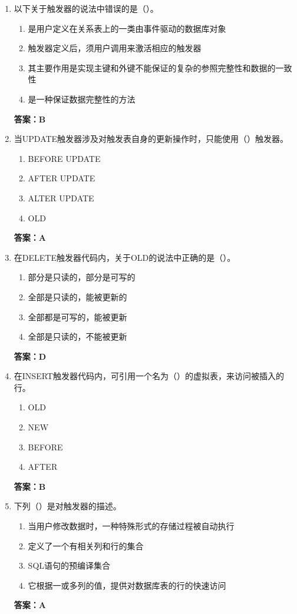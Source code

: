 \documentclass[12pt, a4paper]{article}
\begin{document}
\begin{enumerate}[label=\arabic*.]
	\item 以下关于触发器的说法中错误的是（\quad）。
	      \begin{enumerate}
		      \item 是用户定义在关系表上的一类由事件驱动的数据库对象
		      \item 触发器定义后，须用户调用来激活相应的触发器
		      \item 其主要作用是实现主键和外键不能保证的复杂的参照完整性和数据的一致性
		      \item 是一种保证数据完整性的方法
	      \end{enumerate}
	      \textbf{答案：B}

	\item 当UPDATE触发器涉及对触发表自身的更新操作时，只能使用（\quad）触发器。
	      \begin{enumerate}
		      \item BEFORE UPDATE
		      \item AFTER UPDATE
		      \item ALTER UPDATE
		      \item OLD
	      \end{enumerate}
	      \textbf{答案：A}

	\item 在DELETE触发器代码内，关于OLD的说法中正确的是（\quad）。
	      \begin{enumerate}
		      \item 部分是只读的，部分是可写的
		      \item 全部是只读的，能被更新的
		      \item 全部都是可写的，能被更新
		      \item 全部是只读的，不能被更新
	      \end{enumerate}
	      \textbf{答案：D}

	\item 在INSERT触发器代码内，可引用一个名为（\quad）的虚拟表，来访问被插入的行。
	      \begin{enumerate}
		      \item OLD
		      \item NEW
		      \item BEFORE
		      \item AFTER
	      \end{enumerate}
	      \textbf{答案：B}

	\item 下列（\quad）是对触发器的描述。
	      \begin{enumerate}
		      \item 当用户修改数据时，一种特殊形式的存储过程被自动执行
		      \item 定义了一个有相关列和行的集合
		      \item SQL语句的预编译集合
		      \item 它根据一或多列的值，提供对数据库表的行的快速访问
	      \end{enumerate}
	      \textbf{答案：A}


\end{enumerate}
\end{document}
